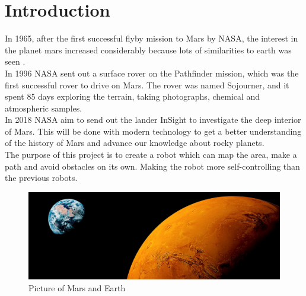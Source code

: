 \chapter{Introduction}\label{ch:introduction}

In 1965, after the first successful flyby mission to Mars by NASA, the interest in the planet mars increased considerably because lots of similarities to earth was seen \cite{NASAChronology}.\\
In 1996 NASA sent out a surface rover on the Pathfinder mission, which was the first successful rover to drive on Mars. The rover was named Sojourner, and it spent 85 days exploring the terrain, taking photographs, chemical and atmospheric samples\cite{NASASojournerPathfinder}\cite{NASAChronology}.\\
In 2018 NASA aim to send out the lander InSight to investigate the deep interior of Mars. This will be done with modern technology to get a better understanding of the history of Mars and advance our knowledge about rocky planets\cite{InSight}.\\

The purpose of this project is to create a robot which can map the area, make a path and avoid obstacles on its own. Making the robot more self-controlling than the previous robots. %


\begin{figure}[h]
    \centering
    \includegraphics[width=\linewidth]{figures/639620382-mars.jpg}
    \caption{Picture of Mars and Earth\cite{MarsPics}}
    \label{fig:marsSeasons}
\end{figure}

